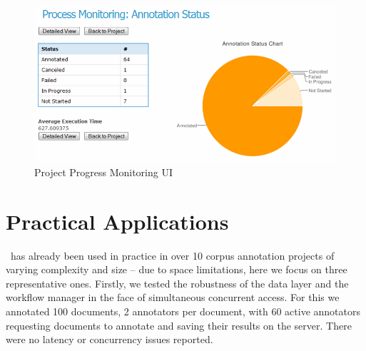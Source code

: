\begin{figure}[h!]
\begin{center}
\includegraphics[scale=0.35]{teamware-project-stats.png}
\caption{Project Progress Monitoring UI} \label{fig:monitorGUI}
\end{center}
\end{figure}

\section{Practical Applications}\label{sect:applications}

\teamware\ has already been used in practice in over 10 corpus annotation projects of varying complexity and size -- due to space limitations, here we focus on three representative ones. Firstly, we tested the robustness of the data layer and the workflow manager in the face of simultaneous concurrent access. For this we annotated 100 documents, 2 annotators per document, with 60 active annotators requesting documents to annotate and saving their results on the server. There were no latency or concurrency issues reported. 

